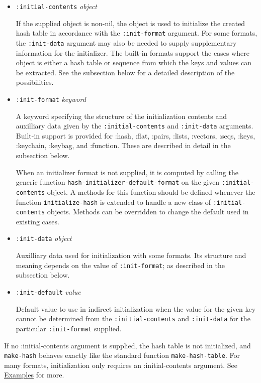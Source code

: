 \documentclass[11pt]{article}
\begin{document}
\begin{itemize}
\item \texttt{:initial-contents} \emph{object}
      
      If the supplied object is non-nil, the object is used to initialize
      the created hash table in accordance with the \texttt{:init-format} argument.
      For some formats, the \texttt{:init-data} argument may also be needed to
      supply supplementary information for the initializer. The built-in
      formats support the cases where object is either a hash table or
      sequence from which the keys and values can be extracted. See the
      subsection below for a detailed description of the possibilities.
\item \texttt{:init-format} \emph{keyword}
  
      A keyword specifying the structure of the initialization contents
      and auxilliary data given by the \texttt{:initial-contents} and \texttt{:init-data}
      arguments. Built-in support is provided for :hash, :flat, :pairs, 
      :lists, :vectors, :seqs, :keys, :keychain, :keybag, and :function.
      These are described in detail in the subsection below. 
      
      When an initializer format is not supplied, it is computed by
      calling the generic function \texttt{hash-initializer-default-format} on
      the given \texttt{:initial-contents} object. A methods for this function
      should be defined whenever the function \texttt{initialize-hash} is
      extended to handle a new class of \texttt{:initial-contents} objects. Methods
      can be overridden to change the default used in existing cases.
\item \texttt{:init-data} \emph{object}
  
      Auxilliary data used for initialization with some formats. Its
      structure and meaning depends on the value of \texttt{:init-format}; as
      described in the subsection below.
\item \texttt{:init-default} \emph{value}
  
      Default value to use in indirect initialization when the value for 
      the given key cannot be determined from the \texttt{:initial-contents} and
      \texttt{:init-data} for the particular \texttt{:init-format} supplied.
\end{itemize}

  If no :initial-contents argument is supplied, the hash table is not
  initialized, and \texttt{make-hash} behaves exactly like the standard
  function \texttt{make-hash-table}. For many formats, initialization only
  requires an :initial-contents argument. See \hyperref[sec-3]{Examples} for more.
\end{document}
